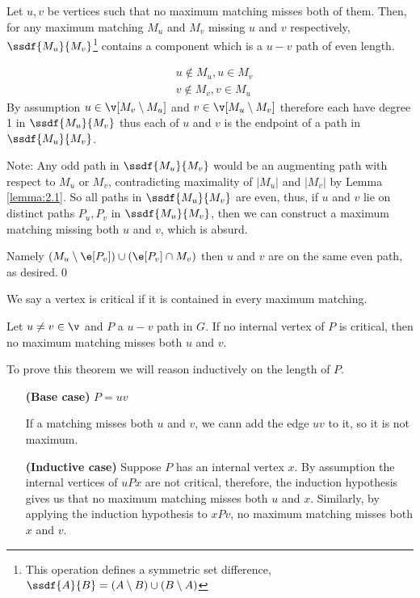 \begin{prf}
    \begin{customclaim}{1}
    \label{claim:theorem_2.10_1}
        Let $u, v$ be vertices such that no maximum matching misses both of them. Then, for any maximum matching $M_u$ and $M_v$ missing $u$ and $v$ respectively, $\ssdf{M_u}{M_v}$\footnote{This operation defines a symmetric set difference, $\ssdf{A}{B} = (A \setminus B) \cup (B \setminus A)$} contains a component which is a $u - v$ path of even length.
    \end{customclaim}
    \begin{prf}
        \begin{align*}
            &u \notin M_u, u \in M_v\\
            &v \notin M_v, v \in M_u
        \end{align*}
        By assumption $u \in \v[M_v \setminus M_u]$ and $v \in \v[M_u \setminus M_v]$ therefore each have degree 1 in $\ssdf{M_u}{M_v}$ thus each of $u$ and $v$ is the endpoint of a path in $\ssdf{M_u}{M_v}$.

        Note: Any odd path in $\ssdf{M_u}{M_v}$ would be an augmenting path with respect to $M_u$ or $M_v$, contradicting maximality of $|M_u|$ and $|M_v|$ by Lemma \ref{lemma:2.1}. So all paths in $\ssdf{M_u}{M_v}$ are even, thus, if $u$ and $v$ lie on distinct paths $P_u, P_v$ in $\ssdf{M_u}{M_v}$, then we can construct a maximum matching missing both $u$ and $v$, which is absurd.
        
        Namely $(M_u \setminus \e[P_v]) \cup (\e[P_v] \cap M_v)$ then $u$ and $v$ are on the same even path, as desired.\qed
    \end{prf}
    We say a vertex is critical if it is contained in every maximum matching.
    \begin{customclaim}{2}
    \label{claim:theorem_2.10_2}
        Let $u \neq v \in \v$ and $P$ a $u - v$ path in $G$. If no internal vertex of $P$ is critical, then no maximum matching misses both $u$ and $v$.
    \end{customclaim}
    \begin{prf}
        To prove this theorem we will reason inductively on the length of $P$.
        \begin{itemize}
            \item[\textbf{(Base case)}] $P = uv$
            
            If a matching misses both $u$ and $v$, we cann add the edge $uv$ to it, so it is not maximum.
            \item[\textbf{(Inductive case)}] Suppose $P$ has an internal vertex $x$. By assumption the internal vertices of $uPx$ are not critical, therefore, the induction hypothesis gives us that no maximum matching misses both $u$ and $x$. Similarly, by applying the induction hypothesis to $xPv$, no maximum matching misses both $x$ and $v$.
            

\end{itemize}
\end{prf}
\end{prf}
